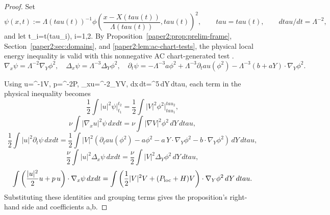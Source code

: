 \documentclass[11pt]{amsart}
\def\({}%
\def\){}%
\def\tilde#1{#1}%
\def\tau{tau}%
\theoremstyle{plain}
\theoremstyle{definition}
\theoremstyle{remark}
\begin{document}
\begin{proof}
Set
\[
\psi(x,t):=\Lambda(\tau(t))^{-1}\phi\!\left(\frac{x-X(\tau(t))}{\Lambda(\tau(t))},\tau(t)\right)^2,
\qquad
\tau=\tau(t),\qquad d\tau/dt=\Lambda^{-2},
\]
and let \(t_i=t(\tau_i)\), \(i=1,2\).  By
Proposition~\ref{paper2:prop:prelim-frame}, Section~\ref{paper2:sec:domains},
and \cref{paper2:lem:ac-chart-tests}, the physical local energy inequality is
valid with this nonnegative AC chart-generated test \(\psi\).
\[
\nabla_x\psi=\Lambda^{-2}\nabla_Y\phi^2,\quad
\Delta_x\psi=\Lambda^{-3}\Delta_Y\phi^2,\quad
\partial_t\psi
=-\Lambda^{-3}\tilde a\phi^2+\Lambda^{-3}\partial_\tau(\phi^2)-\Lambda^{-3}(\tilde b+\tilde aY)\cdot\nabla_Y\phi^2.
\]

Using \(u=\Lambda^{-1}V\), \(p=\Lambda^{-2}P\), \(\nabla_xu=\Lambda^{-2}\nabla_YV\),
\(dx\,dt=\Lambda^{5}\,dY\,d\tau\), each term in the physical inequality becomes
\[
\frac12\int |u|^2\psi\big|_{t_1}^{t_2}
=\frac12\int |V|^2\phi^2\big|_{\tau_1}^{\tau_2},
\]
\[
\nu\int |\nabla_xu|^2\psi\,dxdt
=\nu\int |\nabla V|^2\phi^2\,dY\,d\tau,
\]
\[
\frac12\int |u|^2\partial_t\psi\,dxdt
=\frac12\int |V|^2\left(\partial_\tau(\phi^2)-\tilde a\phi^2-\tilde a\,Y\cdot\nabla_Y\phi^2-\tilde b\cdot\nabla_Y\phi^2\right)\,dY\,d\tau,
\]
\[
\frac{\nu}{2}\int |u|^2\Delta_x\psi\,dxdt
=\frac{\nu}{2}\int |V|^2\Delta_Y\phi^2\,dY\,d\tau,
\]
\[
\int\left(\frac{|u|^2}{2}u+p\,u\right)\cdot\nabla_x\psi\,dxdt
=\int\left(\frac12|V|^2V+(P_{\rm loc}+H)V\right)\cdot\nabla_Y\phi^2\,dY\,d\tau.
\]
Substituting these identities and grouping terms gives the proposition's right-hand
side and coefficients \(\tilde a,\tilde b\).
\end{proof}
\end{document}
